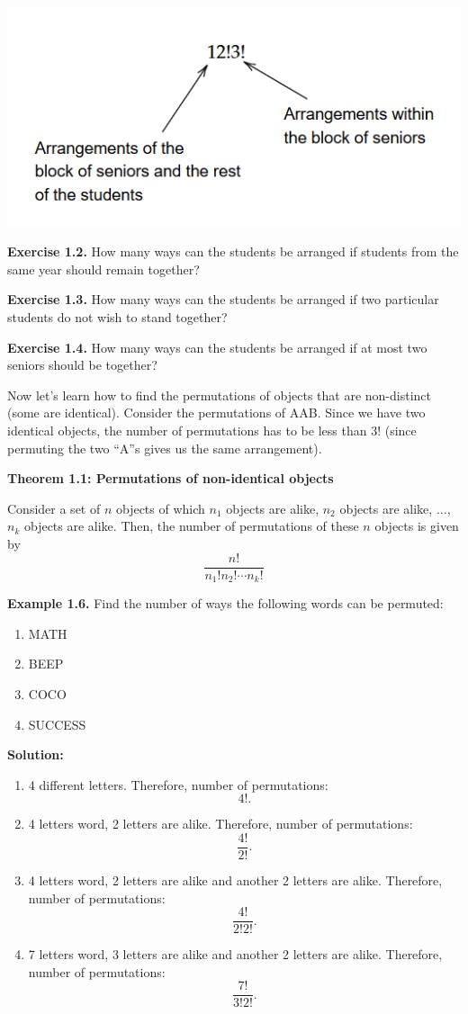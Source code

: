 \documentclass[
  12pt,
]{krantzNoCorner}
\providecommand{\tightlist}{%
  \setlength{\itemsep}{0pt}\setlength{\parskip}{0pt}}
\begin{document}
\includegraphics[width=0.8\linewidth,height=0.5\textheight]{class_example_permutations}

\textbf{Exercise 1.2.} How many ways can the students be arranged if students
from the same year should remain together?

\textbf{Exercise 1.3.} How many ways can the students be arranged if two
particular students do not wish to stand together?

\textbf{Exercise 1.4.} How many ways can the students be arranged if at most
two seniors should be together?

Now let's learn how to find the permutations of objects that are
non-distinct (some are identical). Consider the permutations of AAB.
Since we have two identical objects, the number of permutations has to
be less than \(3!\) (since permuting the two ``A''s gives us the same
arrangement).

\textbf{Theorem 1.1: Permutations of non-identical objects}

Consider a set of \(n\) objects of which \(n_1\) objects are alike, \(n_2\)
objects are alike, \(\dots\), \(n_k\) objects are alike. Then, the number of
permutations of these \(n\) objects is given by
\[\frac{n!}{n_1!n_2!\cdots n_k!}\]

\textbf{Example 1.6.} Find the number of ways the following words can be
permuted:

\begin{enumerate}
\def\labelenumi{\arabic{enumi}.}
\tightlist
\item
  MATH
\item
  BEEP
\item
  COCO
\item
  SUCCESS
\end{enumerate}

\textbf{Solution:}

\begin{enumerate}
\def\labelenumi{\arabic{enumi}.}
\tightlist
\item
  4 different letters. Therefore, number of permutations: \[4!.\]
\item
  4 letters word, 2 letters are alike. Therefore, number of
  permutations: \[\frac{4!}{2!}.\]
\item
  4 letters word, 2 letters are alike and another 2 letters are alike.
  Therefore, number of permutations: \[\frac{4!}{2!2!}.\]
\item
  7 letters word, 3 letters are alike and another 2 letters are alike.
  Therefore, number of permutations: \[\frac{7!}{3!2!}.\]
\end{enumerate}
\end{document}
